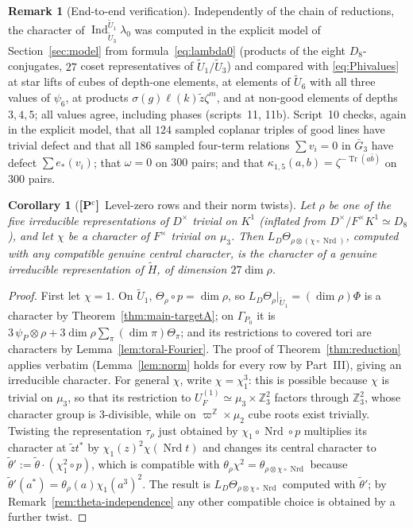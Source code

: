 \documentclass[11pt]{article}
\newcommand{\Z}{\mathbb Z}
\newcommand{\Nrd}{\operatorname{Nrd}}
\newcommand{\Tr}{\operatorname{Tr}}
\newcommand{\Ind}{\operatorname{Ind}}
\newcommand{\tH}{\widetilde H}
\newcommand{\tU}{\widetilde U}
\newcommand{\tth}{\widetilde\theta}
\newcommand{\Pctag}{\textnormal{\textbf{[P$^{\mathrm c}$]}}}
\theoremstyle{plain}
\newtheorem{corollary}[theorem]{Corollary}
\theoremstyle{definition}
\newtheorem{remark}[theorem]{Remark}
\begin{document}
\begin{remark}[End-to-end verification]
Independently of the chain of reductions, the character of
$\Ind_{\tU_3}^{\tU_1}\lambda_0$ was computed in the explicit model of
Section~\ref{sec:model} from formula~\eqref{eq:lambda0} (products of the
eight $D_8$-conjugates, $27$ coset representatives of $\tU_1/\tU_3$) and
compared with \eqref{eq:Phivalues} at star lifts of cubes of depth-one
elements, at elements of $\tU_6$ with all three values of $\psi_6$, at
products $\sigma(g)\ell(k)\tilde z\zeta^m$, and at non-good elements of
depths $3,4,5$; all values agree, including phases (scripts~11, 11b).
Script~10 checks, again in the explicit model, that all $124$ sampled
coplanar triples of good lines have trivial defect and that all $186$
sampled four-term relations $\sum v_i=0$ in $\bar G_3$ have defect
$\sum e_*(v_i)$; that $\omega=0$ on $300$ pairs; and that
$\kappa_{1,5}(a,b)=\zeta^{-\Tr(a\bar b)}$ on $300$ pairs.
\end{remark}

\begin{corollary}[\Pctag\ Level-zero rows and their norm twists]\label{cor:levelzero}
Let $\rho$ be one of the five irreducible representations of $D^\times$
trivial on $K^1$ (inflated from $D^\times/F^\times K^1\simeq D_8$), and let
$\chi$ be a character of $F^\times$ trivial on $\mu_3$.  Then
$L_D\Theta_{\rho\otimes(\chi\circ\Nrd)}$, computed with any compatible
genuine central character, is the character of a genuine irreducible
representation of $\tH$, of dimension $27\dim\rho$.
\end{corollary}
\begin{proof}
First let $\chi=1$.  On $\tU_1$, $\Theta_\rho\circ p=\dim\rho$, so
$L_D\Theta_\rho|_{\tU_1}=(\dim\rho)\Phi$ is a character by
Theorem~\ref{thm:main-targetA}; on $\Gamma_{P_0}$ it is
$3\,\psi_P\otimes\rho+3\dim\rho\sum_\pi(\dim\pi)\Theta_\pi$; and its
restrictions to covered tori are characters by
Lemma~\ref{lem:toral-Fourier}.  The proof of Theorem~\ref{thm:reduction}
applies verbatim (Lemma~\ref{lem:norm} holds for every row by
Part~III), giving an irreducible character.  For general $\chi$, write
$\chi=\chi_1^3$: this is possible because $\chi$ is trivial on $\mu_3$,
so that its restriction to $U_F^{(1)}\simeq\mu_3\times\Z_3^2$ factors
through $\Z_3^2$, whose character group is $3$-divisible, while on
$\varpi^{\Z}\times\mu_2$ cube roots exist trivially.  Twisting the
representation $\tau_\rho$ just obtained by $\chi_1\circ\Nrd\circ p$
multiplies its character at $\tilde zt^*$ by $\chi_1(z)^2\chi(\Nrd t)$
and changes its central character to
$\tth':=\tth\cdot(\chi_1^2\circ p)$, which is compatible with
$\theta_\rho\chi^2=\theta_{\rho\otimes\chi\circ\Nrd}$ because
$\tth'(a^*)=\theta_\rho(a)\chi_1(a^3)^2$.  The result is
$L_D\Theta_{\rho\otimes\chi\circ\Nrd}$ computed with $\tth'$; by
Remark~\ref{rem:theta-independence} any other compatible choice is
obtained by a further twist.
\end{proof}
\end{document}
